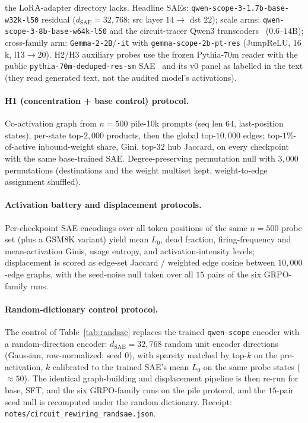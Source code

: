 \documentclass{article}
\begin{document}
the LoRA-adapter directory lacks. Headline SAEs: \texttt{qwen-scope-3-1.7b-base-w32k-l50} residual ($d_{\text{SAE}}{=}32{,}768$; src layer $14\to$ dst $22$); scale arms: \texttt{qwen-scope-3-8b-base-w64k-l50} and the circuit-tracer Qwen3 transcoders~\citep{hanna2025circuittracer} ($0.6$--$14$B); cross-family arm: \texttt{Gemma-2-2B}/\texttt{-it} with \texttt{gemma-scope-2b-pt-res} (JumpReLU, $16$k, l13$\to$20). H2/H3 auxiliary probes use the frozen Pythia-70m reader with the public \texttt{pythia-70m-deduped-res-sm} SAE~\citep{marks2024sparse_circuits} and its v0 panel as labelled in the text (they read generated text, not the audited model's activations).

\paragraph{H1 (concentration + base control) protocol.}
Co-activation graph from $n{=}500$ pile-10k prompts (seq len $64$, last-position states), per-state top-$2{,}000$ products, then the global top-$10{,}000$ edges; top-$1\%$-of-active inbound-weight share, Gini, top-$32$ hub Jaccard, on every checkpoint with the same base-trained SAE. Degree-preserving permutation null with $3{,}000$ permutations (destinations and the weight multiset kept, weight-to-edge assignment shuffled).

\paragraph{Activation battery and displacement protocols.}
Per-checkpoint SAE encodings over all token positions of the same $n{=}500$ probe set (plus a GSM8K variant) yield mean $L_0$, dead fraction, firing-frequency and mean-activation Ginis, usage entropy, and activation-intensity levels; displacement is scored as edge-set Jaccard / weighted edge cosine between $10{,}000$-edge graphs, with the seed-noise null taken over all $15$ pairs of the six GRPO-family runs.

\paragraph{Random-dictionary control protocol.}
The control of Table~\ref{tab:randsae} replaces the trained \texttt{qwen-scope} encoder with a random-direction encoder: $d_{\text{SAE}}=32{,}768$ random unit encoder directions (Gaussian, row-normalized; seed $0$), with sparsity matched by top-$k$ on the pre-activation, $k$ calibrated to the trained SAE's mean $L_0$ on the same probe states ($\approx50$). The identical graph-building and displacement pipeline is then re-run for base, SFT, and the six GRPO-family runs on the pile protocol, and the $15$-pair seed null is recomputed under the random dictionary. Receipt: \texttt{notes/circuit\_rewiring\_randsae.json}.
\end{document}
